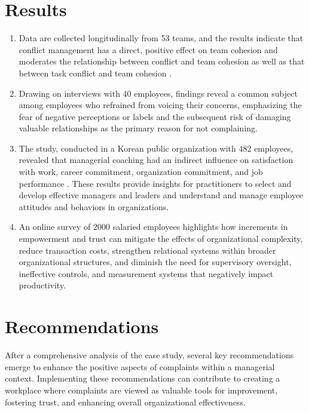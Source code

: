 \documentclass[a4paper,12pt]{report}
\begin{document}
\newpage
\section{Results}
\begin{enumerate}
    \item Data are collected longitudinally from 53 teams, and the results indicate that conflict management has a direct, positive effect on team cohesion and moderates the relationship between conflict and team cohesion as well as that between task conflict and team cohesion \cite{conflict_management}. 
    \item Drawing on interviews with 40 employees,  findings reveal a common subject among employees who refrained from voicing their concerns, emphasizing the fear of negative perceptions or labels and the subsequent risk of damaging valuable relationships as the primary reason for not complaining\cite{employee_silence}.
    \item The study, conducted in a Korean public organization with 482 employees, revealed that managerial coaching had an indirect influence on satisfaction with work, career commitment, organization commitment, and job performance \cite{managerial_coaching}. These results provide insights for practitioners to select and develop effective managers and leaders and understand and manage employee attitudes and behaviors in organizations.
    \item An online survey of 2000 salaried employees highlights how increments in empowerment and trust can mitigate the effects of organizational complexity, reduce transaction costs, strengthen relational systems within broader organizational structures, and diminish the need for supervisory oversight, ineffective controls, and measurement systems that negatively impact productivity\cite{employee_manager}.
\end{enumerate}


\newpage
\section{Recommendations}
After a comprehensive analysis of the case study, several key recommendations emerge to enhance the positive aspects of complaints within a managerial context. Implementing these recommendations can contribute to creating a workplace where complaints are viewed as valuable tools for improvement, fostering trust, and enhancing overall organizational effectiveness.
\end{document}
